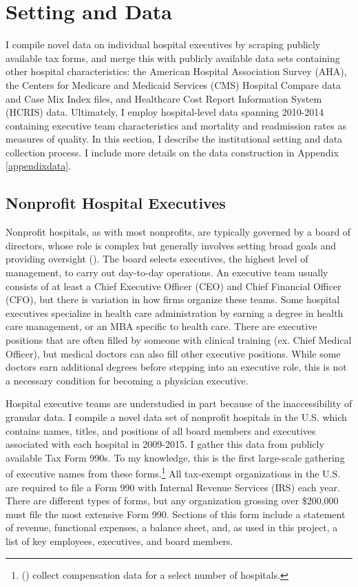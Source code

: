 \documentclass[12pt]{article}
\begin{document}
    \section{Setting and Data}

    I compile novel data on individual hospital executives by scraping publicly available tax forms, and merge this with publicly available data sets containing other hospital characteristics: the American Hospital Association Survey (AHA), the Centers for Medicare and Medicaid Services (CMS) Hospital Compare data and Case Mix Index files, and Healthcare Cost Report Information System (HCRIS) data. Ultimately, I employ hospital-level data spanning 2010-2014 containing executive team characteristics and mortality and readmission rates as measures of quality. In this section, I describe the institutional setting and data collection process. I include more details on the data construction in Appendix \ref{appendixdata}. 

    \subsection{Nonprofit Hospital Executives}

    Nonprofit hospitals, as with most nonprofits, are typically governed by a board of directors, whose role is complex but generally involves setting broad goals and providing oversight (\cite{council_board_roles_2025}). The board selects executives, the highest level of management, to carry out day-to-day operations. An executive team usually consists of at least a Chief Executive Officer (CEO) and Chief Financial Officer (CFO), but there is variation in how firms organize these teams. Some hospital executives specialize in health care administration by earning a degree in health care management, or an MBA specific to health care. There are executive positions that are often filled by someone with clinical training (ex. Chief Medical Officer), but medical doctors can also fill other executive positions. While some doctors earn additional degrees before stepping into an executive role, this is not a necessary condition for becoming a physician executive. 

    Hospital executive teams are understudied in part because of the inaccessibility of granular data. I compile a novel data set of nonprofit hospitals in the U.S. which contains names, titles, and positions of all board members and executives associated with each hospital in 2009-2015. I gather this data from publicly available Tax Form 990s. To my knowledge, this is the first large-scale gathering of executive names from these forms.\footnote{\citeauthor{brickley2010board} (\citeyear{brickley2010board}) collect compensation data for a select number of hospitals.} All tax-exempt organizations in the U.S. are required to file a Form 990 with Internal Revenue Services (IRS) each year. There are different types of forms, but any organization grossing over \$200,000 must file the most extensive Form 990. Sections of this form include a statement of revenue, functional expenses, a balance sheet, and, as used in this project, a list of key employees, executives, and board members. 
\end{document}
